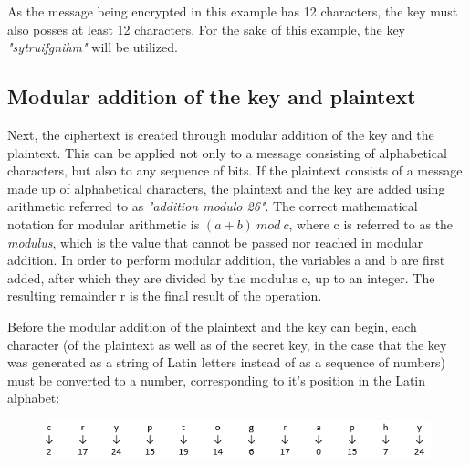 \documentclass[12pt]{report}
\theoremstyle{definition}
\theoremstyle{remark}
\begin{document}
As the message being encrypted in this example has 12 characters, the key must also posses at least 12 characters. For the sake of this example, the key \textit{"sytruifgnihm"} will be utilized.

\subsection{Modular addition of the key and plaintext}



Next, the ciphertext is created through modular addition of the key and the plaintext. This can be applied not only to a message consisting of alphabetical characters, but also to any sequence of bits. If the plaintext consists of a message made up of alphabetical characters, the plaintext and the key are added using arithmetic referred to as \textit{"addition modulo 26"}. The correct mathematical notation for modular arithmetic is $(a+b)\:mod\:c$, where c is referred to as the \textit{modulus}, which is the value that cannot be passed nor reached in modular addition. In order to perform modular addition, the variables a and b are first added, after which they are divided by the modulus c, up to an integer. The resulting remainder r is the final result of the operation.

Before the modular addition of the plaintext and the key can begin, each character (of the plaintext as well as of the secret key, in the case that the key was generated as a string of Latin letters instead of as a sequence of numbers) must be converted to a number, corresponding to it's position in the Latin alphabet:

\begin{figure}[H]
\centering
\includegraphics[scale=1]{Table1.PNG}		
\end{figure}
\end{document}
